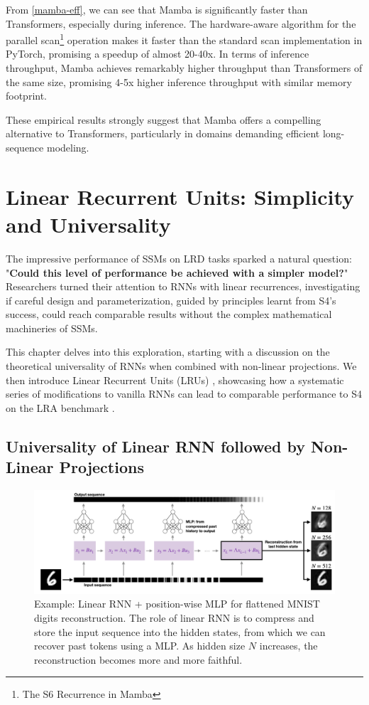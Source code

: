 \documentclass[12pt,a4paper]{report}
\begin{document}
From \ref{mamba-eff}, we can see that Mamba is significantly faster than Transformers, especially during inference. The hardware-aware algorithm for the parallel scan\footnote{The S6 Recurrence in Mamba} operation makes it faster than the standard scan implementation in PyTorch, promising a speedup of almost 20-40x. In terms of inference throughput, Mamba achieves remarkably higher throughput than Transformers of the same size, promising 4-5x higher inference throughput with similar memory footprint.

\bigskip

These empirical results strongly suggest that Mamba offers a compelling alternative to Transformers, particularly in domains demanding efficient long-sequence modeling.


\chapter{Linear Recurrent Units: Simplicity and Universality}

The impressive performance of SSMs on LRD tasks sparked a natural question: "\textbf{Could this level of performance be achieved with a simpler model?}" Researchers turned their attention to RNNs with linear recurrences, investigating if careful design and parameterization, guided by principles learnt from S4's success, could reach comparable results without the complex mathematical machineries of SSMs.

\medskip

This chapter delves into this exploration, starting with a discussion on the theoretical universality of RNNs when combined with non-linear projections. We then introduce Linear Recurrent Units (LRUs) \cite{lru}, showcasing how a systematic series of modifications to vanilla RNNs can lead to comparable performance to S4 on the LRA benchmark \cite{lra}.

\section{Universality of Linear RNN followed by Non-Linear Projections}

\begin{figure}[ht]
    \centerline{\includegraphics[scale=0.6]{C5.1_Universality_LRNN.png}}
    \caption{Example: Linear RNN + position-wise MLP for flattened MNIST digits reconstruction. The role of linear RNN is to compress and store the input sequence into the hidden states, from which we can recover past tokens using a MLP. As hidden size $N$ increases, the reconstruction becomes more and more faithful.}
    \label{univ-rnn}
\end{figure}
\end{document}
